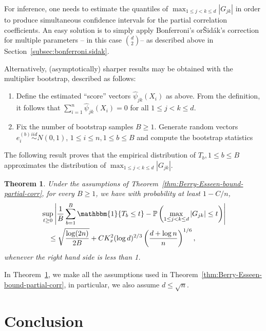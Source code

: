 \documentclass{article}
\newtheorem{theorem}{Theorem}
\begin{document}
 For inference, one needs to estimate the quantiles of $\max_{1\le j < k\le d}|G_{jk}|$ in order to produce simultaneous confidence intervals for the partial correlation coefficients. An easy solution is to simply apply Bonferroni's or{\v{S}}id{\'a}k's correction for multiple parameters -- in this case ${d \choose 2} $--  as described above in Section~\ref{subsec:bonferroni.sidak}.
 
 Alternatively, (asymptotically) sharper results may be obtained with the multiplier bootstrap, described as follows:
 \begin{enumerate}
 \item Define the estimated ``score'' vectors $\widehat{\psi}_{jk}(X_i)$ as above. From the definition, it follows that $\sum_{i=1}^n \widehat{\psi}_{jk}(X_i) = 0$ for all $1\le j < k\le d$.
 \item Fix the number of bootstrap samples $B \ge 1$. Generate random vectors $e_i^{(b)}\overset{iid}{\sim}N(0, 1)$, $1\le i\le n, 1\le b\le B$ and compute the bootstrap statistics
 \
 \end{enumerate}
 The following result proves that the empirical distribution of $T_b, 1\le b\le B$ approximates the distribution of $\max_{1\le j < k\le d}|G_{jk}|$.
 \begin{theorem}\label{eq:multplier-bootstrap-consistency-partial-corr}
 Under the assumptions of Theorem~\ref{thm:Berry-Esseen-bound-partial-corr}, for every $B\ge1$, we have with probability at least $1 - C/n$,
 \begin{align*}
 &\sup_{t\ge0}\left|\frac{1}{B}\sum_{b=1}^B \mathbbm{1}\{T_b \le t\} - \mathbb{P}\left(\max_{1\le j < k\le d}|G_{jk}| \le t\right)\right|\\ 
 &\quad\le \sqrt{\frac{\log(2n)}{2B}} + CK_x^{2}(\log d)^{{2}/{3}}\left(\frac{d + \log n}{n}\right)^{{1}/{6}},
 \end{align*}
 whenever the right hand side is less than 1.
 \end{theorem}
 In Theorem~\ref{eq:multplier-bootstrap-consistency-partial-corr}, we make all the assumptions used in Theorem~\ref{thm:Berry-Esseen-bound-partial-corr}, in particular, we also assume $d \le \sqrt{n}$.
 
 
 
 
 
 
 \section{Conclusion}
 \label{section::conclusion}
 
\end{document}
